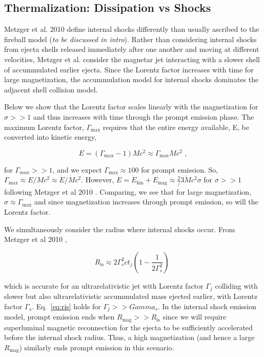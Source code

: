 \documentclass{article}
\begin{document}
\subsection{Thermalization: Dissipation vs Shocks}
Metzger et al. 2010 define internal shocks differently than usually ascribed to the fireball model (\textit{to be discussed in intro}). Rather than considering internal shocks from ejecta shells released immediately after one another and moving at different velocities, Metzger et al. consider the magnetar jet interacting with a slower shell of accummulated earlier ejecta. Since the Lorentz factor increases with time for large magnetization, the accummulation model for internal shocks dominates the adjacent shell collision model.

Below we show that the Lorentz factor scales linearly with the magnetization for $\sigma >>1$ and thus increases with time through the prompt emission phase.
The maximum Lorentz factor, $\Gamma_{\mathrm{max}}$ requires that the entire energy available, E, be  converted into kinetic energy,

\begin{equation} E = (\Gamma_{\mathrm{max}}-1) M c^2 \approx \Gamma_{\mathrm{max}} M c^2 \,\,,
\end{equation}

for $\Gamma_{max}>>1$, and we expect $\Gamma_{\mathrm{max}}\approx 100$ for prompt emission. So, $\Gamma_{\mathrm{max}} \approx E/{M c^2} \approx \dot{E}/\dot{M} c^2$. However, $E=\dot{E}_{\mathrm{kin}}+\dot{E}_{\mathrm{mag}} \approx \frac{2}/{3} \dot{M} c^2 \sigma$ for $\sigma>>1$ following Metzger et al 2010 \cite{Metzger:2010pp}. Comparing, we see that for large magnetization, $\sigma \approx \Gamma_{\mathrm{max}}$ and since magnetization increases through prompt emission, so will the Lorentz factor.

We simultaneously consider the radius where internal shocks occur. From Metzger et al 2010 \cite{Metzger:2010pp},

\begin{equation}\label{eq:ris}
R_{\mathrm{is}} \approx 2\Gamma_s^2 c t_j(1-\frac{1}{2\Gamma_s^2})\,\,
\end{equation}

which is accurate for an ultrarelativistic jet with Lorentz factor $\Gamma_j$ colliding with slower but also ultrarelativistic accummulated mass ejected earlier, with Lorentz factor $\Gamma_s$. Eq.~\ref{eq:ris} holds for $\Gamma_{j}>>Gamma_{s}$. In the internal shock emission model, prompt emission ends when $R_{\mathrm{mag}}>>R_{\mathrm{is}}$ since we will require superluminal magnetic reconnection for the ejecta to be sufficiently accelerated before the internal shock radius. Thus, a high magnetization (and hence a large $R_{\mathrm{mag}}$) similarly ends prompt emission in this scenario.
\end{document}
